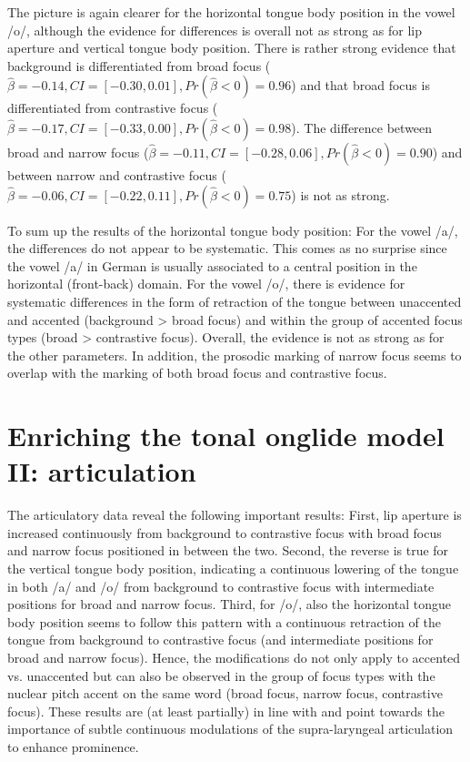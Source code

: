 The picture is again clearer for the horizontal tongue body position in the vowel /o/, although the evidence for differences is overall not as strong as for lip aperture and vertical tongue body position. There is rather strong evidence that background is differentiated from broad focus  ($\hat\beta=-0.14, CI=[-0.30, 0.01], \allowbreak Pr(\hat\beta<0)=0.96$) and that broad focus is differentiated from contrastive focus ($\hat\beta=-0.17 , CI=[-0.33, 0.00], \allowbreak Pr(\hat\beta<0)=0.98$). The difference between broad and narrow focus ($\hat\beta=-0.11 , CI=[-0.28, 0.06], \allowbreak Pr(\hat\beta<0)=0.90$) and between narrow and contrastive focus ($\hat\beta=-0.06 , CI=[-0.22, 0.11], \allowbreak Pr(\hat\beta<0)=0.75$) is not as strong.

To sum up the results of the horizontal tongue body position: For the vowel /a/, the differences do not appear to be systematic. This comes as no surprise since the vowel /a/ in German is usually associated to a central position in the horizontal (front-back) domain. For the vowel /o/, there is evidence for systematic differences in the form of retraction of the tongue between unaccented and accented (background > broad focus) and within the group of accented focus types (broad > contrastive focus). Overall, the evidence is not as strong as for the other parameters. In addition, the prosodic marking of narrow focus seems to overlap with the marking of both broad focus and contrastive focus.

\section{Enriching the tonal onglide model II: articulation}

The articulatory data reveal the following important results: First, lip aperture is increased continuously from background to contrastive focus with broad focus and narrow focus positioned in between the two. Second, the reverse is true for the vertical tongue body position, indicating a continuous lowering of the tongue in both /a/ and /o/ from background to contrastive focus with intermediate positions for broad and narrow focus. Third, for /o/, also the horizontal tongue body position seems to follow this pattern with a continuous retraction of the tongue from background to contrastive focus (and intermediate positions for broad and narrow focus). Hence, the modifications do not only apply to accented vs. unaccented but can also be observed in the group of focus types with the nuclear pitch accent on the same word (broad focus, narrow focus, contrastive focus). These results are (at least partially) in line with \citet{MückeGrice2014} and point towards the importance of subtle continuous modulations of the supra-laryngeal articulation to enhance prominence.


